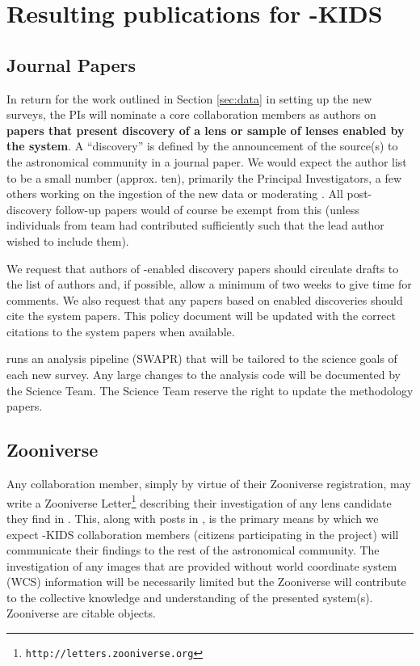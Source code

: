 \documentclass[a4paper,twocolumn]{article}
\begin{document}

\section{Resulting publications for \SW-KIDS }
\label{sec:series}

\subsection{Journal Papers}
\label{sec:papers}
In return for the work outlined in Section \ref{sec:data} in setting up the new surveys, the \SW PIs will nominate a core \SW collaboration members as authors on \textbf{papers that
present discovery of a lens or sample of lenses enabled by the \SW system}. A ``discovery'' is defined by the announcement of the source(s) to the astronomical community in a journal paper. We would expect the \SW author list to be a small number (approx. ten), primarily the Principal Investigators, a few others working on the ingestion of the new data or moderating \Talk. All post-discovery follow-up papers would of course be exempt from this (unless individuals from \sw team had contributed sufficiently such that the lead author wished to include them). 

We request that authors of \SW-enabled discovery papers should circulate drafts to the list of \SW authors and, if possible, allow a minimum of two weeks to give time for comments. We also request that any papers based on \SW enabled discoveries should cite the \SW system papers. This policy document will be updated with the correct citations to the \SW system papers when available.

\SW runs an analysis pipeline (SWAPR) that will be tailored to the science goals of each new survey. Any large changes to the analysis code will be documented  by the \SW Science Team. The \SW Science Team reserve the right to update the \SW methodology papers.



\subsection{Zooniverse \Letters}
\label{sec:comm}

Any \SW collaboration member, simply by virtue of their Zooniverse
registration, may write a Zooniverse
Letter\footnote{\texttt{http://letters.zooniverse.org}} describing their
investigation of any lens candidate they find in \SW. This, along with
posts in  \Talk, is the primary means by which we expect \SW-KIDS collaboration
members (citizens participating in the project) will communicate their findings to the rest of the
astronomical community. The investigation of any \SW images that are
provided without world coordinate system (WCS) information will be
necessarily limited but the \SW Zooniverse \Letters will contribute to the collective knowledge and understanding of the presented system(s). Zooniverse \Letters are citable \SW
objects.
\end{document}
